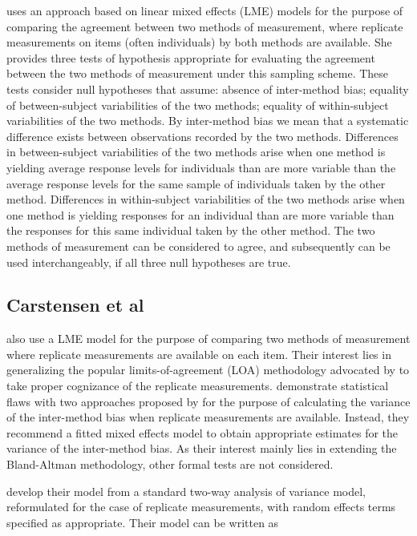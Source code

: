 \documentclass[12pt, a4paper]{report}
\theoremstyle{plain}
\theoremstyle{definition}
\theoremstyle{remark}
\begin{document}
	\citet{ARoy2009} uses an approach based on linear mixed effects (LME) models for the purpose of comparing the agreement between two methods of measurement, where replicate measurements on items (often individuals) by both methods are available. She provides three tests of hypothesis appropriate for evaluating the agreement between the two methods of measurement under this sampling scheme. These tests consider null hypotheses that assume: absence of inter-method bias; equality of between-subject variabilities of the two methods; equality of within-subject variabilities of the two methods. By inter-method bias we mean that a systematic difference exists between observations recorded by the two methods. Differences in between-subject variabilities of the two methods arise when one method is yielding average response levels for individuals than are more variable than the average response levels for the same sample of individuals taken by the other method.  Differences in within-subject variabilities of the two methods arise when one method is yielding responses for an individual than are more variable than the responses for this same individual taken by the other method. The two methods of measurement can be considered to agree, and subsequently can be used interchangeably, if all three null hypotheses are true.


\bigskip


	\subsection{Carstensen et al}
	\cite{BXC2008} also use a LME model for the purpose of comparing two methods of measurement where replicate measurements are available on each item. Their interest lies in generalizing the popular limits-of-agreement (LOA) methodology advocated by \citet{BA86} to take proper cognizance of the replicate measurements. \citet{BXC2008} demonstrate statistical flaws with two approaches proposed by \citet{BA99} for the purpose of calculating the variance of the inter-method bias when replicate measurements are available. Instead, they recommend a fitted mixed effects model to obtain appropriate estimates for the variance of the inter-method bias. As their interest mainly lies in extending the Bland-Altman methodology, other formal tests are not considered.
	
	\bigskip
	
	\citet{BXC2008} develop their model from a standard two-way analysis of variance model, reformulated for the case of replicate measurements, with random effects terms specified as appropriate.
	Their model can be written as
	
\end{document}
